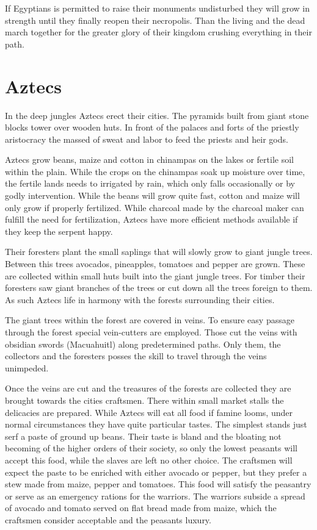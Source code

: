 \documentclass[a4paper]{article}
\begin{document}
		If \gls{Egyptians} is permitted to raise their monuments undisturbed
		they will grow in strength until they finally reopen their necropolis.
		Than the living and the dead march together for the greater glory
		of their kingdom crushing everything in their path.

\section{\Gls{Aztecs}}
	In the deep jungles \gls{Aztecs} erect their cities.
	The pyramids built from giant stone blocks tower over wooden huts.
	In front of the palaces and forts of the priestly aristocracy the massed of sweat 
	and labor to feed the priests and heir gods.

	\Gls{Aztecs} grow beans, maize and cotton in chinampas on the lakes or fertile soil within the plain.
	While the crops on the chinampas soak up moisture over time,
	the fertile lands needs to irrigated by rain, which only falls occasionally or by godly intervention.
	While the beans will grow quite fast, cotton and maize will only grow if properly fertilized.
	While charcoal made by the charcoal maker can fulfill the need for fertilization,
	\gls{Aztecs} have more efficient methods available if they keep the serpent happy.

	Their foresters plant the small saplings that will slowly grow to giant jungle trees.
	Between this trees avocados, pineapples, tomatoes and pepper are grown.
	These are collected within small huts built into the giant jungle trees.
	For timber their foresters saw giant branches of the trees or cut down all the trees foreign to them.
	As such \gls{Aztecs} life in harmony with the forests surrounding their cities.

	The giant trees within the forest are covered in veins.
	To ensure easy passage through the forest special vein-cutters are employed.
	Those cut the veins with obsidian swords (Macuahuitl) along predetermined paths.
	Only them, the collectors and the foresters posses the skill to travel through the veins unimpeded.

	Once the veins are cut and the treasures of the forests are collected they are
	brought towards the cities craftsmen.
	There within small market stalls the delicacies are prepared.
	While \gls{Aztecs} will eat all food if famine looms,
	under normal circumstances they have quite particular tastes.
	The simplest stands just serf a paste of ground up beans.
	Their taste is bland and the bloating not becoming of the higher orders of their society,
	so only the lowest peasants will accept this food,
	while the slaves are left no other choice.
	The craftsmen will expect the paste to be enriched with either avocado or pepper,
	but they prefer a stew made from maize, pepper and tomatoes.
	This food will satisfy the peasantry or serve as an emergency rations for the warriors.
	The warriors subside a spread of avocado and tomato served on flat bread made from maize,
	which the craftsmen consider acceptable and the peasants luxury.
\end{document}
